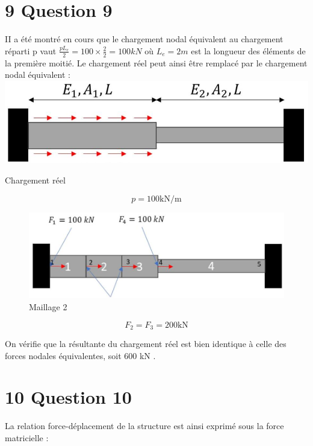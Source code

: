 \documentclass[11pt,a4paper]{report}
\begin{document}
{\section*{9 Question 9}
II a été montré en cours que le chargement nodal équivalent au chargement réparti p vaut $\frac{p L_{e}}{2}=100 \times \frac{2}{2}= 100 k N$ où $L_{e}=2 m$ est la longueur des éléments de la première moitié. Le chargement réel peut ainsi être remplacé par le chargement nodal équivalent :\\
\includegraphics[max width=\textwidth, center]{2025_10_03_26e11264345fd9bad5cag-7(1)}

Chargement réel

$$
p=100 \mathrm{kN} / \mathrm{m}
$$

\begin{figure}[h]
\begin{center}
  \includegraphics[width=\textwidth]{2025_10_03_26e11264345fd9bad5cag-7}
\captionsetup{labelformat=empty}
\caption{Maillage 2}
\end{center}
\end{figure}

$$
F_{2}=F_{3}=200 \mathrm{kN}
$$

On vérifie que la résultante du chargement réel est bien identique à celle des forces nodales équivalentes, soit 600 kN .

\section*{10 Question 10}
La relation force-déplacement de la structure est ainsi exprimé sous la force matricielle :

}
\end{document}
